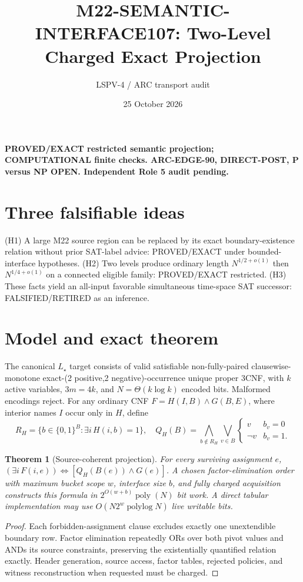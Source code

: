 \documentclass[11pt]{article}
\title{M22-SEMANTIC-INTERFACE107: Two-Level Charged Exact Projection}
\author{LSPV-4 / ARC transport audit}
\date{25 October 2026}
\newtheorem{theorem}{Theorem}
\begin{document}
\maketitle
\noindent\textbf{PROVED/EXACT restricted semantic projection; COMPUTATIONAL finite checks. ARC-EDGE-90, DIRECT-POST, P versus NP OPEN. Independent Role 5 audit pending.}
\section{Three falsifiable ideas}
(H1) A large M22 source region can be replaced by its exact boundary-existence relation without prior SAT-label advice: PROVED/EXACT under bounded-interface hypotheses.
(H2) Two levels produce ordinary length \(N^{1/2+o(1)}\) then \(N^{1/4+o(1)}\) on a connected eligible family: PROVED/EXACT restricted.
(H3) These facts yield an all-input favorable simultaneous time-space SAT successor: FALSIFIED/RETIRED as an inference.
\section{Model and exact theorem}
The canonical \(L_\star\) target consists of valid satisfiable non-fully-paired clausewise-monotone exact-(2 positive,2 negative)-occurrence unique proper 3CNF, with \(k\) active variables, \(3m=4k\), and \(N=\Theta(k\log k)\) encoded bits. Malformed encodings reject.
For any ordinary CNF \(F=H(I,B)\land G(B,E)\), where interior names \(I\) occur only in \(H\), define
\[
R_H=\{b\in\{0,1\}^B:\exists i\,H(i,b)=1\},\quad
Q_H(B)=\bigwedge_{b\notin R_H}\bigvee_{v\in B}
\begin{cases}v&b_v=0\\\neg v&b_v=1.\end{cases}
\]
\begin{theorem}[Source-coherent projection]
For every surviving assignment \(e\), \((\exists i\,F(i,e))\iff [Q_H(B(e))\land G(e)]\). A chosen factor-elimination order with maximum bucket scope \(w\), interface size \(b\), and fully charged acquisition constructs this formula in \(2^{O(w+b)}\operatorname{poly}(N)\) bit work. A direct tabular implementation may use \(O(N2^w\operatorname{polylog} N)\) live writable bits.
\end{theorem}
\begin{proof}
Each forbidden-assignment clause excludes exactly one unextendible boundary row. Factor elimination repeatedly ORs over both pivot values and ANDs its source constraints, preserving the existentially quantified relation exactly. Header generation, source access, factor tables, rejected policies, and witness reconstruction when requested must be charged.
\end{proof}
\end{document}
